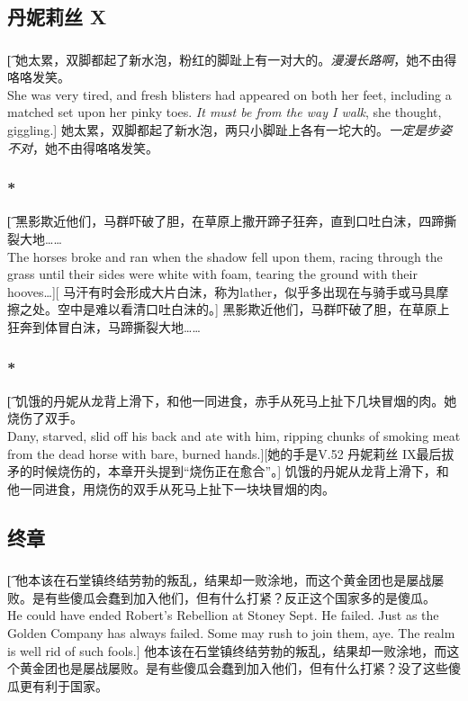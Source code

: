 \documentclass[12pt,a4paper]{article}
\begin{document}
\subsection{丹妮莉丝 X}
\subsubsection{}\t[
	她太累，双脚都起了新水泡，粉红的脚趾上有一对大的。\emph{漫漫长路啊}，她不由得咯咯发笑。\\
	She was very tired, and fresh blisters had appeared on both her feet, including a matched set upon her pinky toes. \emph{It must be from the way I walk}, she thought, giggling.]
	她太累，双脚都起了新水泡，两只小脚趾上各有一坨大的。\emph{一定是步姿不对}，她不由得咯咯发笑。

\subsubsection{\color{red}*}\t[
	黑影欺近他们，马群吓破了胆，在草原上撒开蹄子狂奔，直到口吐白沫，四蹄撕裂大地……\\
	The horses broke and ran when the shadow fell upon them, racing through the grass until their sides were white with foam, tearing the ground with their hooves…][
	马汗有时会形成大片白沫，称为lather，似乎多出现在与骑手或马具摩擦之处。空中是难以看清口吐白沫的。]
	黑影欺近他们，马群吓破了胆，在草原上狂奔到体冒白沫，马蹄撕裂大地……

\subsubsection{\color{red}*}\t[
	饥饿的丹妮从龙背上滑下，和他一同进食，赤手从死马上扯下几块冒烟的肉。她烧伤了双手。\\
	Dany, starved, slid off his back and ate with him, ripping chunks of smoking meat from the dead horse with bare, burned hands.][她的手是V.52 丹妮莉丝 IX最后拔矛的时候烧伤的，本章开头提到“烧伤正在愈合”。]
	饥饿的丹妮从龙背上滑下，和他一同进食，用烧伤的双手从死马上扯下一块块冒烟的肉。
	
\subsection{终章}
\subsubsection{}\t[
	他本该在石堂镇终结劳勃的叛乱，结果却一败涂地，而这个黄金团也是屡战屡败。是有些傻瓜会蠢到加入他们，但有什么打紧？反正这个国家多的是傻瓜。\\
	He could have ended Robert's Rebellion at Stoney Sept. He failed. Just as the Golden Company has always failed. Some may rush to join them, aye. The realm is well rid of such fools.]
	他本该在石堂镇终结劳勃的叛乱，结果却一败涂地，而这个黄金团也是屡战屡败。是有些傻瓜会蠢到加入他们，但有什么打紧？没了这些傻瓜更有利于国家。
	
\end{document}
